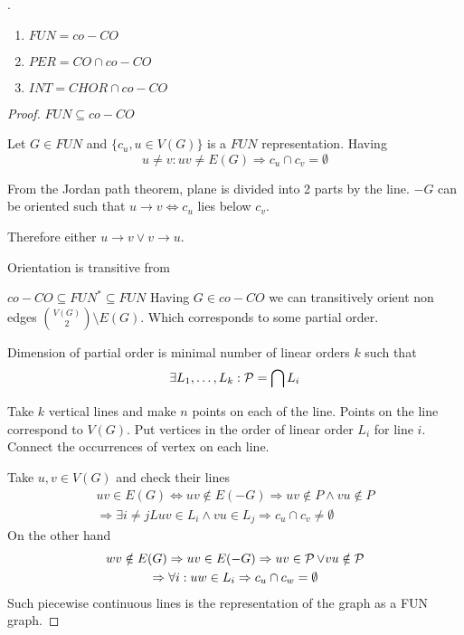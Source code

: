 \begin{theorem}[Complements]
	.
	\begin{enumerate}
		\item $FUN = co-CO$
		\item $PER = CO \cap co-CO$
		\item $INT = CHOR \cap co-CO$
	\end{enumerate}
\end{theorem}
\begin{proof}
	$FUN \subseteq co-CO$

	Let $G \in FUN$ and $\{ c_u, u \in V(G) \}$ is a $FUN$ representation.
	Having
	\[ u \ne v: uv \ne E(G) \Rightarrow c_u \cap c_v = \emptyset \]

	From the Jordan path theorem, plane is divided into 2 parts by the line.
	$-G$ can be oriented such that $u \rightarrow v \iff c_u$ lies below $c_v$.

	Therefore either $u \rightarrow v \lor v \rightarrow u$.

	Orientation is transitive from %

	$co-CO \subseteq FUN^{\ast} \subseteq FUN$
	Having $G \in co-CO$ we can transitively orient non edges $\binom{V(G)}{2} \setminus E(G)$.
	Which corresponds to some partial order.

	\begin{definition}[PO dimension]
		Dimension of partial order is minimal number of linear orders $k$ such that
		\[ \exists L_1, \ldots, L_k: \operatorname{\mathcal{P}} = \bigcap L_i \]
	\end{definition}

	Take $k$ vertical lines and make $n$ points on each of the line.
	Points on the line correspond to $V(G)$.
	Put vertices in the order of linear order $L_i$ for line $i$.
	Connect the occurrences of vertex on each line.

	Take $u, v \in V(G)$ and check their lines
	\begin{gather*}
		uv \in E(G) \iff uv \notin E(-G) \Rightarrow uv \notin P \land vu \notin P \\
	\Rightarrow \exists i \ne jL uv \in L_i \land vu \in L_j \Rightarrow c_u \cap c_v \ne \emptyset
	\end{gather*}
	On the other hand
	\begin{gather*}
		wv \notin E(G) \Rightarrow uv \in E(-G) \Rightarrow uv \in \operatorname{\mathcal{P}} \lor vu \notin \operatorname{\mathcal{P}} \\
		\Rightarrow \forall i: uw \in L_i \Rightarrow c_u \cap c_w = \emptyset
	\end{gather*}
	Such piecewise continuous lines is the representation of the graph as a FUN graph.
\end{proof}
